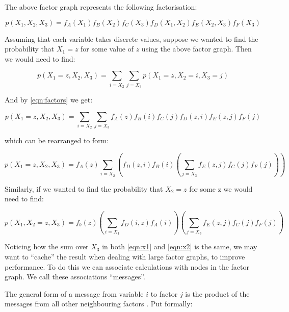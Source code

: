 The above factor graph represents the following factorisation:

\begin{equation}
    p(X_1, X_2, X_3) = f_A(X_1)f_B(X_2)f_C(X_3)f_D(X_1, X_2)f_E(X_2, X_3)f_F(X_3)
    \label{eqn:factors}
\end{equation}

Assuming that each variable takes discrete values, suppose we wanted to find the probability that $X_1 = z$ for some value of $z$ using the above factor graph. Then we would need to find:

\begin{equation}
    p(X_1 = z, X_2, X_3) = \underset{i=X_2}{\sum} \underset{j=X_3}{\sum} p(X_1 = z, X_2 = i, X_3 =j)
    \label{eqn:bp_derivation_1}
\end{equation}

And by \ref{eqn:factors} we get:

\begin{equation}
    p(X_1 = z, X_2, X_3) = \underset{i=X_2}{\sum} \underset{j=X_3}{\sum} f_A(z)f_B(i)f_C(j)f_D(z, i)f_E(z, j)f_F(j)
\end{equation}


which can be rearranged to form:

\begin{equation}
    p(X_1 = z, X_2, X_3) = f_A(z) \underset{i=X_2}{\sum} \left(f_D(z, i)f_B(i) \left(\underset{j=X_3}{\sum} f_E(z, j)f_C(j)f_F(j) \right)\right)
    \label{eqn:x1}
\end{equation}

Similarly, if we wanted to find the probability that $X_2 = z$ for some z we would need to find:

\begin{equation}
    p(X_1, X_2 = z, X_3) = f_b(z) \left(\underset{i=X_1}{\sum} f_D(i, z) f_A(i)\right) \left(\underset{j=X_3}{\sum} f_E(z, j) f_C(j) f_F(j)\right)
    \label{eqn:x2}
\end{equation}

Noticing how the sum over $X_3$ in both \ref{eqn:x1} and \ref{eqn:x2} is the same, we may want to ``cache'' the result when dealing with large factor graphs, to improve performance. To do this we can associate calculations with nodes in the factor graph. We call these associations ``messages''.

The general form of a message from variable $i$ to factor $j$ is the product of the messages from all other neighbouring factors \cite{GaussianBP}. Put formally:

